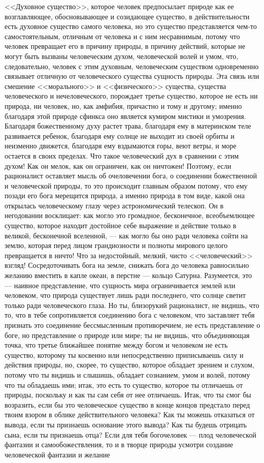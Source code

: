 \documentclass[12pt,oneside]{book}
\begin{document}
<<Духовное существо>>, которое человек предпосылает природе как ее возглавляющее, обосновывающее и созидающее существо, в действительности есть духовное существо самого человека, но это существо представляется чем-то самостоятельным, отличным от человека и с ним несравнимым, потому что человек превращает его в причину природы, в причину действий, которые не могут быть вызваны человеческим духом, человеческой волей и умом, что, следовательно, человек с этим духовным, человеческим существом одновременно связывает отличную от человеческого существа сущность природы. Эта связь или смешение <<морального>> и <<физического>> существа, существа человеческого и нечеловеческого, порождает третье существо, которое не есть ни природа, ни человек, но, как амфибия, причастно и тому и другому; именно благодаря этой природе сфинкса оно является кумиром мистики и умозрения. Благодаря божественному духу растет трава, благодаря ему в материнском теле развивается ребенок, благодаря ему солнце не выходит из своей орбиты и неизменно движется, благодаря ему вздымаются горы, веют ветры, и море остается в своих пределах. Что такое человеческий дух в сравнении с этим духом! Как он мелок, как он ограничен, как он ничтожен! Поэтому, если рационалист оставляет мысль об очеловечении бога, о соединении божественной и человеческой природы, то это происходит главным образом потому, что ему позади его бога мерещится природа, а именно природа в том виде, какой она открылась человеческому глазу через астрономический телескоп. Он в негодовании восклицает: как могло это громадное, бесконечное, всеобъемлющее существо, которое находит достойное себе выражение и действие только в великой, бесконечной вселенной, --- как могло бы оно ради человека сойти на землю, которая перед лицом грандиозности и полноты мирового целого превращается в ничто! Что за недостойный, мелкий, чисто <<человеческий>> взгляд! Сосредоточивать бога на земле, снижать бога до человека равносильно желанию вместить в капле океан, в перстне --- кольцо Сатурна. Разумеется, это --- наивное представление, что сущность мира ограничивается землей или человеком, что природа существует лишь ради последнего, что солнце светит только ради человеческого глаза. Но ты, близорукий рационалист, не видишь, что то, что в тебе сопротивляется соединению бога с человеком, что заставляет тебя признать это соединение бессмысленным противоречием, не есть представление о боге, но представление о природе или мире; ты не видишь, что объединяющая точка, что третье ближайшее понятие между богом и человеком не есть существо, которому ты косвенно или непосредственно приписываешь силу и действия природы, но, скорее, то существо, которое обладает зрением и слухом, потому что ты видишь и слышишь, обладает сознанием, умом и волей, потому что ты обладаешь ими; итак, это есть то существо, которое ты отличаешь от природы, поскольку и как ты сам себя от нее отличаешь. Итак, что ты смог бы возразить, если бы это человеческое существо в конце концов предстало перед твоим взором в облике действительного человека? Как ты можешь отказаться от вывода, если ты признаешь основание этого вывода? Как ты будешь отрицать сына, если ты признаешь отца? Если для тебя богочеловек --- плод человеческой фантазии и самообожествления, то и в творце природы усмотри создание человеческой фантазии и желание 
\end{document}
